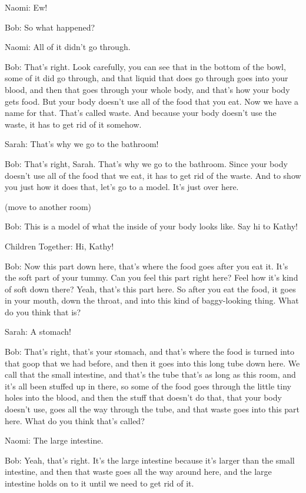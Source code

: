 Naomi: Ew!

Bob: So what happened?

Naomi: All of it didn't go through.

Bob: That's right. Look carefully, you can see that in the bottom of the bowl, some of it did go through, and that liquid that does go through goes into your blood, and then that goes through your whole body, and that's how your body gets food. But your body doesn't use all of the food that you eat. Now we have a name for that. That's called waste. And because your body doesn't use the waste, it has to get rid of it somehow.

Sarah: That's why we go to the bathroom!

Bob: That's right, Sarah. That's why we go to the bathroom. Since your body doesn't use all of the food that we eat, it has to get rid of the waste. And to show you just how it does that, let's go to a model. It's just over here.

(move to another room)

Bob: This is a model of what the inside of your body looks like. Say hi to Kathy!

Children Together: Hi, Kathy!

Bob: Now this part down here, that's where the food goes after you eat it. It's the soft part of your tummy. Can you feel this part right here? Feel how it's kind of soft down there? Yeah, that's this part here. So after you eat the food, it goes in your mouth, down the throat, and into this kind of baggy-looking thing. What do you think that is?

Sarah: A stomach!

Bob: That's right, that's your stomach, and that's where the food is turned into that goop that we had before, and then it goes into this long tube down here. We call that the small intestine, and that's the tube that's as long as this room, and it's all been stuffed up in there, so some of the food goes through the little tiny holes into the blood, and then the stuff that doesn't do that, that your body doesn't use, goes all the way through the tube, and that waste goes into this part here. What do you think that's called?

Naomi: The large intestine.

Bob: Yeah, that's right. It's the large intestine because it's larger than the small intestine, and then that waste goes all the way around here, and the large intestine holds on to it until we need to get rid of it.

